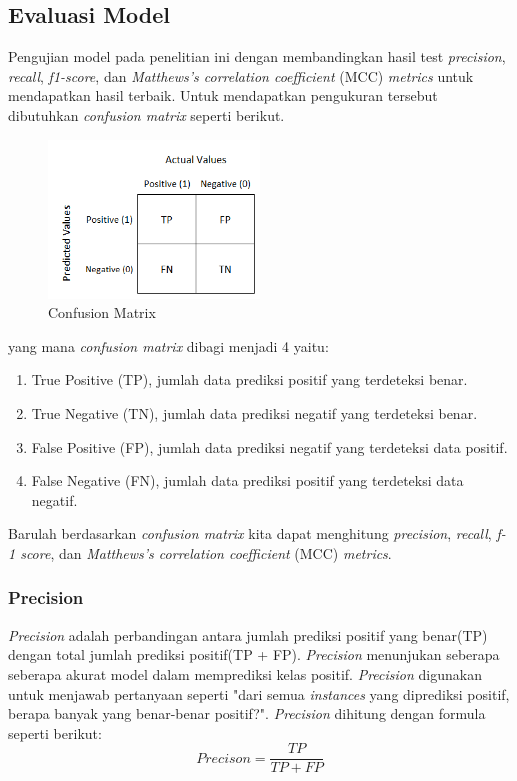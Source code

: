 \subsection{Evaluasi Model} \label{II.evaluasimodel}
Pengujian model pada penelitian ini dengan membandingkan hasil test \textit{precision}, \textit{recall}, \textit{f1-score}, dan \textit{Matthews’s correlation coefficient} (MCC) \textit{metrics} untuk mendapatkan hasil terbaik. Untuk mendapatkan pengukuran tersebut dibutuhkan \textit{confusion matrix} seperti berikut.
\begin{figure}[H]
	\centering
	\includegraphics[width=0.5\textwidth]{figure/confusion_matrix.png}
	\caption{Confusion Matrix}
	\label{fig:2.confusionmatrix}
\end{figure}
yang mana \textit{confusion matrix} dibagi menjadi 4 yaitu:
\begin{enumerate}[noitemsep]
    \item True Positive (TP), jumlah data prediksi positif yang terdeteksi benar.
    \item True Negative (TN), jumlah data prediksi negatif yang terdeteksi benar.
    \item False Positive (FP), jumlah data prediksi negatif yang terdeteksi data positif.
    \item False Negative (FN), jumlah data prediksi positif yang terdeteksi data negatif.
\end{enumerate}
Barulah berdasarkan \textit{confusion matrix} kita dapat menghitung \textit{precision}, \textit{recall},     \textit{f-1 score}, dan \textit{Matthews’s correlation coefficient} (MCC) \textit{metrics}.

\subsubsection{Precision}
\textit{Precision} adalah perbandingan antara jumlah prediksi positif yang benar(TP) dengan total jumlah prediksi positif(TP + FP). \textit{Precision} menunjukan seberapa seberapa akurat model dalam memprediksi kelas positif. \textit{Precision} digunakan untuk menjawab pertanyaan seperti "dari semua \textit{instances} yang diprediksi positif, berapa banyak yang benar-benar positif?". \textit{Precision} dihitung dengan formula seperti berikut:\\
\begin{equation}
Precison = \frac{TP}{TP + FP} 
\end{equation}
\label{eq:2.precision}

